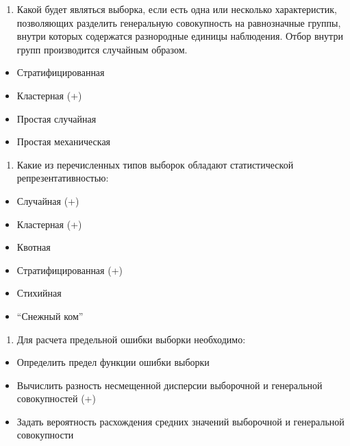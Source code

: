 \documentclass[11pt]{article}
\providecommand{\tightlist}{%
      \setlength{\itemsep}{0pt}\setlength{\parskip}{0pt}}
\begin{document}
    \begin{enumerate}
\def\labelenumi{\arabic{enumi})}
\setcounter{enumi}{10}
\tightlist
\item
  Какой будет являться выборка, если есть одна или несколько
  характеристик, позволяющих разделить генеральную совокупность на
  равнозначные группы, внутри которых содержатся разнородные единицы
  наблюдения. Отбор внутри групп производится случайным образом.
\end{enumerate}

\begin{itemize}
\tightlist
\item
  Стратифицированная
\item
  Кластерная (+)
\item
  Простая случайная
\item
  Простая механическая
\end{itemize}

    \begin{enumerate}
\def\labelenumi{\arabic{enumi})}
\setcounter{enumi}{11}
\tightlist
\item
  Какие из перечисленных типов выборок обладают статистической
  репрезентативностью:
\end{enumerate}

\begin{itemize}
\tightlist
\item
  Случайная (+)
\item
  Кластерная (+)
\item
  Квотная
\item
  Стратифицированная (+)
\item
  Стихийная
\item
  ``Снежный ком''
\end{itemize}

    \begin{enumerate}
\def\labelenumi{\arabic{enumi})}
\setcounter{enumi}{12}
\tightlist
\item
  Для расчета предельной ошибки выборки необходимо:
\end{enumerate}

\begin{itemize}
\tightlist
\item
  Определить предел функции ошибки выборки
\item
  Вычислить разность несмещенной дисперсии выборочной и генеральной
  совокупностей (+)
\item
  Задать вероятность расхождения средних значений выборочной и
  генеральной совокупности
\end{itemize}
\end{document}
